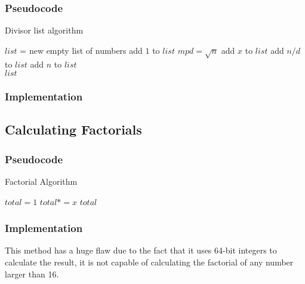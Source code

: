 \documentclass[letterpaper]{article}
\begin{document}
      \subsubsection{Pseudocode}
        \begin{algorithm}
          \caption{Divisor list algorithm}
          \begin{algorithmic}[1]
              \State $list$ = new empty list of numbers
              \State add $1$ to $list$
              \State $mpd = \sqrt{n}$
                  \State add $x$ to $list$
                    \State add $n/d$ to $list$
                  \EndIf
                \EndIf
              \EndFor
              \State add $n$ to $list$ \\
              \Return $list$
            \EndProcedure
          \end{algorithmic}
        \end{algorithm}

    \subsubsection{Implementation}
      

    \subsection{Calculating Factorials}

      \subsubsection{Pseudocode}
        \begin{algorithm}
          \caption{Factorial Algorithm}
          \begin{algorithmic}[1]
              \State $total=1$
                \State $total*=x$
              \EndFor
              \Return $total$
            \EndProcedure
          \end{algorithmic}
        \end{algorithm}

      \subsubsection{Implementation}
        This method has a huge flaw due to the fact that it uses 64-bit integers to calculate the result, it is not capable of calculating the factorial of any number larger than 16.
        
\end{document}
